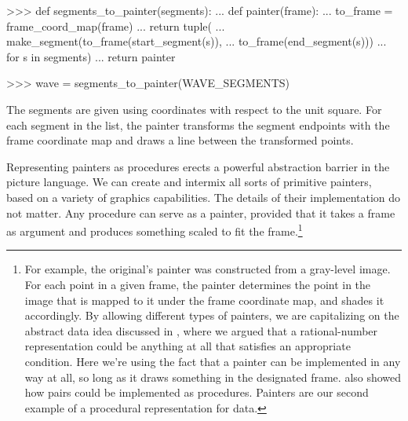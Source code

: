 \begin{codeBlock}
>>> def segments_to_painter(segments):
...     def painter(frame):
...         to_frame = frame_coord_map(frame)
...         return tuple(
...             make_segment(to_frame(start_segment(s)),
...                          to_frame(end_segment(s)))
...             for s in segments)
...     return painter

>>> wave = segments_to_painter(WAVE_SEGMENTS)
\end{codeBlock}

\noindent
The segments are given using coordinates with respect to the unit square.  For
each segment in the list, the painter transforms the segment endpoints with the
frame coordinate map and draws a line between the transformed points.

Representing painters as procedures erects a powerful abstraction barrier in
the picture language.  We can create and intermix all sorts of primitive
painters, based on a variety of graphics capabilities. The details of their
implementation do not matter.  Any procedure can serve as a painter, provided
that it takes a frame as argument and produces something scaled to fit the
frame.\footnote{For example, the original's  painter was
constructed from a gray-level image.  For each point in a given frame, the
 painter determines the point in the image that is mapped to it
under the frame coordinate map, and shades it accordingly.  By allowing
different types of painters, we are capitalizing on the abstract data idea
discussed in , where we argued that a rational-number
representation could be anything at all that satisfies an appropriate
condition.  Here we're using the fact that a painter can be implemented in any
way at all, so long as it draws something in the designated frame.
 also showed how pairs could be implemented as procedures.
Painters are our second example of a procedural representation for data.}

